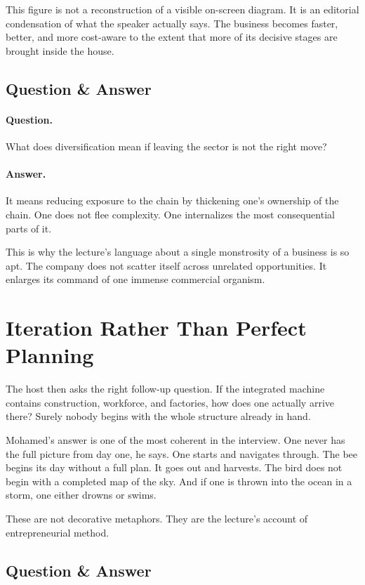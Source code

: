 This figure is not a reconstruction of a visible on-screen diagram. It is an editorial condensation of what the speaker actually says. The business becomes faster, better, and more cost-aware to the extent that more of its decisive stages are brought inside the house.

\subsection{Question \& Answer}

\paragraph{Question.} What does diversification mean if leaving the sector is not the right move?

\paragraph{Answer.} It means reducing exposure to the chain by thickening one's ownership of the chain. One does not flee complexity. One internalizes the most consequential parts of it.

This is why the lecture's language about a single monstrosity of a business is so apt. The company does not scatter itself across unrelated opportunities. It enlarges its command of one immense commercial organism.

\section{Iteration Rather Than Perfect Planning}

The host then asks the right follow-up question. If the integrated machine contains construction, workforce, and factories, how does one actually arrive there? Surely nobody begins with the whole structure already in hand.

Mohamed's answer is one of the most coherent in the interview. One never has the full picture from day one, he says. One starts and navigates through. The bee begins its day without a full plan. It goes out and harvests. The bird does not begin with a completed map of the sky. And if one is thrown into the ocean in a storm, one either drowns or swims.

These are not decorative metaphors. They are the lecture's account of entrepreneurial method.

\subsection{Question \& Answer}

